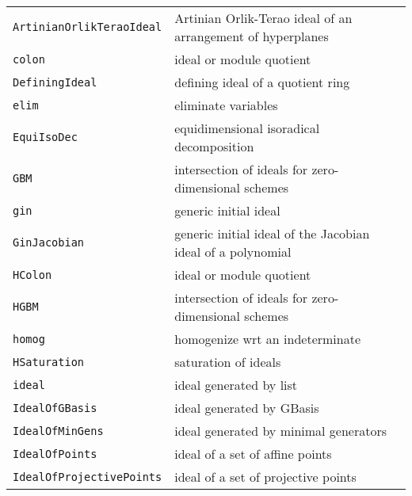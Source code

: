\documentclass[a4paper]{mybook}
\begin{document}
\begin{center}
\begin{longtable}{ll}
   
{\verb~ArtinianOrlikTeraoIdeal~} &
      Artinian Orlik-Terao ideal of an arrangement of hyperplanes\\
   
{\verb~colon~} &
      ideal or module quotient\\
   
{\verb~DefiningIdeal~} &
      defining ideal of a quotient ring\\
   
{\verb~elim~} &
      eliminate variables\\
   
{\verb~EquiIsoDec~} &
      equidimensional isoradical decomposition\\
   
{\verb~GBM~} &
      intersection of ideals for zero-dimensional schemes\\
   
{\verb~gin~} &
      generic initial ideal\\
   
{\verb~GinJacobian~} &
      generic initial ideal of the Jacobian ideal of a polynomial\\
   
{\verb~HColon~} &
      ideal or module quotient\\
   
{\verb~HGBM~} &
      intersection of ideals for zero-dimensional schemes\\
   
{\verb~homog~} &
      homogenize wrt an indeterminate\\
   
{\verb~HSaturation~} &
      saturation of ideals\\
   
{\verb~ideal~} &
      ideal generated by list\\
   
{\verb~IdealOfGBasis~} &
      ideal generated by GBasis\\
   
{\verb~IdealOfMinGens~} &
      ideal generated by minimal generators\\
   
{\verb~IdealOfPoints~} &
      ideal of a set of affine points\\
   
{\verb~IdealOfProjectivePoints~} &
      ideal of a set of projective points\\
   

\end{longtable}
\end{center}
\end{document}
